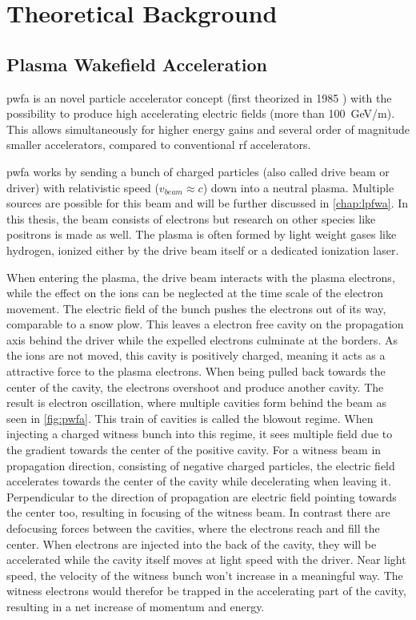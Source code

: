 \documentclass[bachelor_thesis]{subfiles}
\begin{document}
\chapter{Theoretical Background}
\section{Plasma Wakefield Acceleration}
\Gls{pwfa} is an novel particle accelerator concept (first theorized in 1985 \cite{chen1985}) with the possibility to produce high accelerating electric fields (more than \qty{100}{\GeV/\m}). This allows simultaneously for higher energy gains 
and several order of magnitude smaller accelerators, compared to conventional \gls{rf} accelerators.

\Gls{pwfa} works by sending a bunch of charged particles (also called drive beam or driver) with relativistic speed ($v_{beam}\approx c$) down into a neutral plasma. Multiple sources are possible for this beam and will be further discussed in \autoref{chap:lpfwa}.
In this thesis, the beam consists of electrons but research on other species like positrons \cite{Gessner2016} is made as well. The plasma is often formed by light weight gases like hydrogen, ionized either by the drive beam itself or a dedicated ionization laser.

When entering the plasma, the drive beam interacts with the plasma electrons, while the effect on the ions can be neglected at the time scale of the electron movement. The electric field of the bunch pushes the electrons out of its way, comparable to a snow plow. 
This leaves a electron free cavity on the propagation axis behind the driver while the expelled electrons culminate at the borders. As the ions are not moved, this cavity is positively charged, meaning it acts as a attractive force to the plasma electrons.
When being pulled back towards the center of the cavity, the electrons overshoot and produce another cavity. The result is electron oscillation, where multiple cavities form behind the beam as seen in \autoref{fig:pwfa}.
This train  of cavities is called the blowout regime. When injecting a charged witness bunch into this regime, it sees multiple field due to the gradient towards the center of the positive cavity. For a witness beam in propagation direction, 
consisting of negative charged particles, the electric field accelerates towards the center of the cavity while decelerating when leaving it. Perpendicular to the direction of propagation are electric field pointing towards the center too, resulting in focusing of the witness beam. 
In contrast there are defocusing forces between the cavities, where the electrons reach and fill the center. When electrons are injected into the back of the cavity, they will be accelerated while the cavity itself moves at light speed with the driver.
Near light speed, the velocity of the witness bunch won't increase in a meaningful way. The witness electrons would therefor be trapped in the accelerating part of the cavity, resulting in a net increase of momentum and energy. 
\end{document}
